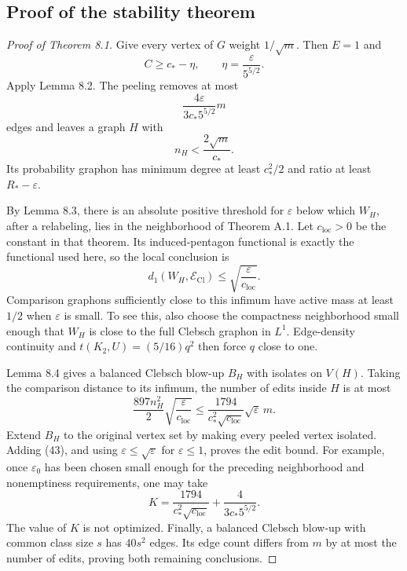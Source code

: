 \documentclass[11pt]{amsart}
\theoremstyle{definition}
\theoremstyle{remark}
\begin{document}
\subsection{Proof of the stability theorem}

\begin{proof}[Proof of Theorem 8.1]
Give every vertex of $G$ weight $1/\sqrt m$. Then $E=1$ and
\[
 C\geq c_\ast-\eta,\qquad\eta=\frac{\varepsilon}{5^{5/2}}.
\]
Apply Lemma 8.2. The peeling removes at most
\begin{equation}\tag{43}\label{eq:43}
 \frac{4\varepsilon}{3c_\ast5^{5/2}}m
\end{equation}
edges and leaves a graph $H$ with
\[
 n_H<\frac{2\sqrt m}{c_\ast}.
\]
Its probability graphon has minimum degree at least $c_\ast^2/2$ and ratio
at least $R_\ast-\varepsilon$.

By Lemma 8.3, there is an absolute positive threshold for $\varepsilon$
below which $W_H$, after a relabeling, lies in the neighborhood of Theorem
A.1. Let $c_{\mathrm{loc}}>0$ be the constant in that theorem. Its
induced-pentagon functional is exactly the functional used here, so the
local conclusion is
\[
 d_1(W_H,\mathcal E_{\mathrm{Cl}})\leq
 \sqrt{\frac{\varepsilon}{c_{\mathrm{loc}}}}.
\]
Comparison graphons sufficiently close to this infimum have active mass
at least $1/2$ when $\varepsilon$ is small. To see this, also choose the
compactness neighborhood small enough that $W_H$ is close to the full
Clebsch graphon in $L^1$. Edge-density continuity and
$t(K_2,U)=(5/16)q^2$ then force $q$ close to one.

Lemma 8.4 gives a balanced Clebsch blow-up $B_H$ with isolates on $V(H)$.
Taking the comparison distance to its infimum, the number of edits inside
$H$ is at most
\[
 \frac{897n_H^2}2\sqrt{\frac{\varepsilon}{c_{\mathrm{loc}}}}
 \leq\frac{1794}{c_\ast^2\sqrt{c_{\mathrm{loc}}}}
 \sqrt\varepsilon\,m.
\]
Extend $B_H$ to the original vertex set by making every peeled vertex
isolated. Adding (43), and using $\varepsilon\leq\sqrt\varepsilon$ for
$\varepsilon\leq1$, proves the edit bound. For example, once
$\varepsilon_0$ has been chosen small enough for the preceding neighborhood
and nonemptiness requirements, one may take
\[
 K=\frac{1794}{c_\ast^2\sqrt{c_{\mathrm{loc}}}}
   +\frac4{3c_\ast5^{5/2}}.
\]
The value of $K$ is not optimized. Finally, a balanced Clebsch blow-up with
common class size $s$ has $40s^2$ edges. Its edge count differs from $m$ by
at most the number of edits, proving both remaining conclusions.
\end{proof}
\end{document}
